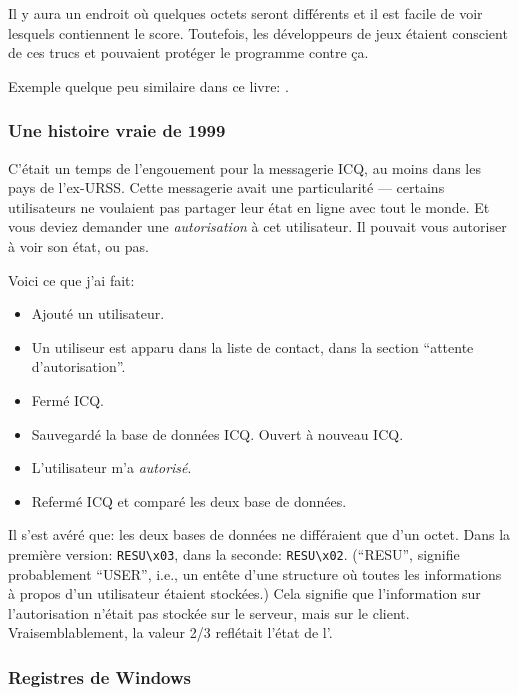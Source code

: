 Il y aura un endroit où quelques octets seront différents et il est facile de voir
lesquels contiennent le score.
Toutefois, les développeurs de jeux étaient conscient de ces trucs et pouvaient protéger
le programme contre ça.

Exemple quelque peu similaire dans ce livre: .


\subsubsection{Une histoire vraie de 1999}

C'était un temps de l'engouement pour la messagerie ICQ, au moins dans les pays de
l'ex-URSS.
Cette messagerie avait une particularité --- certains utilisateurs ne voulaient pas
partager leur état en ligne avec tout le monde.
Et vous deviez demander une \emph{autorisation} à cet utilisateur.
Il pouvait vous autoriser à voir son état, ou pas.

Voici ce que j'ai fait:

\begin{itemize}
\item Ajouté un utilisateur.
\item Un utiliseur est apparu dans la liste de contact, dans la section ``attente d'autorisation''.
\item Fermé ICQ.
\item Sauvegardé la base de données ICQ.
\iten Ouvert à nouveau ICQ.
\item L'utilisateur m'a \emph{autorisé}.
\item Refermé ICQ et comparé les deux base de données.
\end{itemize}

Il s'est avéré que: les deux bases de données ne différaient que d'un octet.
Dans la première version: \verb|RESU\x03|, dans la seconde: \verb|RESU\x02|.
(``RESU'', signifie probablement ``USER'', i.e., un entête d'une structure où toutes
les informations à propos d'un utilisateur étaient stockées.)
Cela signifie que l'information sur l'autorisation n'était pas stockée sur le serveur,
mais sur le client. Vraisemblablement, la valeur 2/3 reflétait l'état de l'.

\subsubsection{Registres de Windows}


